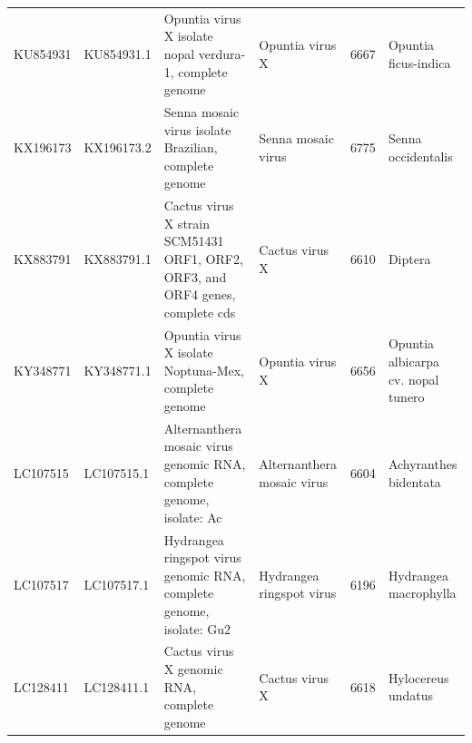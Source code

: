 \documentclass[11pt]{article}
\begin{document}
\begin{supptable}[ht]
{\begin{tabular}{llllll}
KU854931 & KU854931.1 & Opuntia virus X isolate nopal verdura-1, complete genome                                                                                                                                                                                                         & Opuntia virus X                & 6667            & Opuntia ficus-indica                  \\
KX196173 & KX196173.2 & Senna mosaic virus isolate Brazilian, complete genome                                                                                                                                                                                                            & Senna mosaic virus             & 6775            & Senna occidentalis                    \\
KX883791 & KX883791.1 & Cactus virus X strain SCM51431 ORF1, ORF2, ORF3, and ORF4 genes, complete cds                                                                                                                                                                                    & Cactus virus X                 & 6610            & Diptera                               \\
KY348771 & KY348771.1 & Opuntia virus X isolate Noptuna-Mex, complete genome                                                                                                                                                                                                             & Opuntia virus X                & 6656            & Opuntia albicarpa cv. nopal tunero    \\
LC107515 & LC107515.1 & Alternanthera mosaic virus genomic RNA, complete genome, isolate: Ac                                                                                                                                                                                             & Alternanthera mosaic virus     & 6604            & Achyranthes bidentata                 \\
LC107517 & LC107517.1 & Hydrangea ringspot virus genomic RNA, complete genome, isolate: Gu2                                                                                                                                                                                              & Hydrangea ringspot virus       & 6196            & Hydrangea macrophylla                 \\
LC128411 & LC128411.1 & Cactus virus X genomic RNA, complete genome                                                                                                                                                                                                                      & Cactus virus X                 & 6618            & Hylocereus undatus                    \\

\end{tabular}}
\end{supptable}
\end{document}
